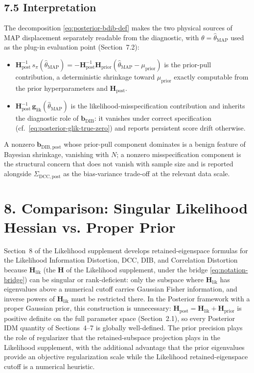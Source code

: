 \documentclass[11pt]{article}
\begin{document}
\subsection*{7.5 Interpretation}

The decomposition \eqref{eq:posterior-bdib-def} makes the two physical sources of MAP displacement separately readable from the diagnostic, with $\theta = \hat\theta_{\mathrm{MAP}}$ used as the plug-in evaluation point (Section~7.2):
\begin{itemize}
\item $\mathbf H_{\mathrm{post}}^{-1}\, s_\pi(\hat\theta_{\mathrm{MAP}}) = -\mathbf H_{\mathrm{post}}^{-1}\mathbf H_{\mathrm{prior}}(\hat\theta_{\mathrm{MAP}} - \mu_{\mathrm{prior}})$ is the prior-pull contribution, a deterministic shrinkage toward $\mu_{\mathrm{prior}}$ exactly computable from the prior hyperparameters and $\mathbf H_{\mathrm{post}}$.
\item $\mathbf H_{\mathrm{post}}^{-1}\,\mathbf g_{\mathrm{lik}}(\hat\theta_{\mathrm{MAP}})$ is the likelihood-misspecification contribution and inherits the diagnostic role of $\mathbf b_{\mathrm{DIB}}$: it vanishes under correct specification (cf.\ \eqref{eq:posterior-glik-true-zero}) and reports persistent score drift otherwise.
\end{itemize}
A nonzero $\mathbf b_{\mathrm{DIB},\mathrm{post}}$ whose prior-pull component dominates is a benign feature of Bayesian shrinkage, vanishing with $N$; a nonzero misspecification component is the structural concern that does not vanish with sample size and is reported alongside $\Sigma_{\mathrm{DCC},\mathrm{post}}$ as the bias-variance trade-off at the relevant data scale.

\section*{8. Comparison: Singular Likelihood Hessian vs. Proper Prior}

Section~8 of the Likelihood supplement develops retained-eigenspace formulas for the Likelihood Information Distortion, DCC, DIB, and Correlation Distortion because $\mathbf H_{\mathrm{lik}}$ (the $\mathbf H$ of the Likelihood supplement, under the bridge \eqref{eq:notation-bridge}) can be singular or rank-deficient: only the subspace where $\mathbf H_{\mathrm{lik}}$ has eigenvalues above a numerical cutoff carries Gaussian Fisher information, and inverse powers of $\mathbf H_{\mathrm{lik}}$ must be restricted there. In the Posterior framework with a proper Gaussian prior, this construction is unnecessary: $\mathbf H_{\mathrm{post}} = \mathbf H_{\mathrm{lik}} + \mathbf H_{\mathrm{prior}}$ is positive definite on the full parameter space (Section~2.1), so every Posterior IDM quantity of Sections~4--7 is globally well-defined. The prior precision plays the role of regularizer that the retained-subspace projection plays in the Likelihood supplement, with the additional advantage that the prior eigenvalues provide an objective regularization scale while the Likelihood retained-eigenspace cutoff is a numerical heuristic.
\end{document}
